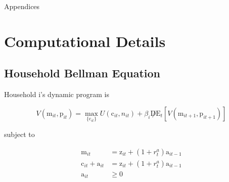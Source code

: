 \documentclass[titlepage]{\econtex}\providecommand{\texname}{BufferStockTheory}
\providecommand{\FigDir}{Figures}
\begin{document}




\clearpage\vfill\eject

\appendix

\centerline{\LARGE Appendices}\vspace{0.2in}




\clearpage\vfill\eject

\normalsize


\hypertarget{Computational Details}{}
\section{Computational Details}

\hypertarget{Household Bellman Equation }{}
\subsection{Household Bellman Equation}

Household i's dynamic program is

$$ V(\pmb{\mathrm{m}}_{it},\pmb{\mathrm{p}}_{it})=\max_{\{ \pmb{\mathrm{c}}_{it}\}} { U( \pmb{\mathrm{c}}_{it}, n_{it}) + \beta_{i} \not D \mathrm{E}_{t}[V( \pmb{\mathrm{m}}_{it+1} , \pmb{\mathrm{p}}_{it+1})]}$$

subject to 

\begin{align*}
 \pmb{\mathrm{m}}_{i t} & = \pmb{\mathrm{z}}_{i t}  + (1+\mathit{r}^{a}_{t})\pmb{\mathrm{a}}_{i t-1} \\
 \pmb{\mathrm{c}}_{i t}  + \pmb{\mathrm{a}}_{i t} &= \pmb{\mathrm{z}}_{i t}  + (1+\mathit{r}^{a}_{t}) \pmb{\mathrm{a}}_{i t-1}   \\
\pmb{\mathrm{a}}_{it} &\geq 0 
\end{align*} \\ \\
\end{document}
